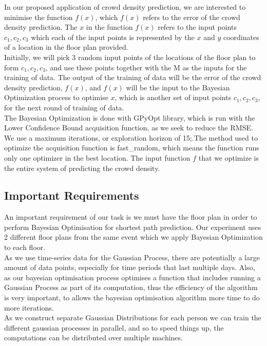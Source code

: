 \documentclass[letterpaper]{article}
\begin{document}
In our proposed application of crowd density prediction, we are interested to minimise the function $f(x)$, which $f(x)$ refers to the error of the crowd density prediction. The $x$ in the function $f(x)$ refers to the input points $c_1, c_2, c_3$ which each of the input points is represented by the $x$ and $y$ coordinates of a location in the floor plan provided.  \\

Initially, we will pick 3 random input points of the locations of the floor plan to form $c_1, c_2, c_3$, and use these points together with the M as the inputs for the training of data. The output of the training of data will be the error of the crowd density prediction, $f(x)$, and $f(x)$ will be the input to the Bayesian Optimization process to optimise $x$, which is another set of input points $c_1, c_2, c_3$, for the next round of training of data. \\

The Bayesian Optimization is done with GPyOpt library, which is run with the Lower Confidence Bound acquisition function, as we seek to reduce the RMSE. We use a maximum iterations, or exploration horizon of 15;.The method used to optimize the acquisition function is fast\_random, which means the function runs only one optimizer in the best location. The input function $f$ that we optimize is the entire system of predicting the crowd density.

\subsection{Important Requirements}

An important requirement of our task is we must have the floor plan in order to perform Bayesian Optimisation for shortest path prediction. Our experiment uses 2 different floor plans from the same event which we apply Bayesian Optimization to each floor.\\

As we use time-series data for the Gaussian Process, there are potentially a large amount of data points, especially for time periods that last multiple days. Also, as our bayesian optimisation process optimises a function that includes running a Gaussian Process as part of its computation, thus the efficiency of the algorithm is very important, to allows the bayesian optimisation algorithm more time to do more iterations.\\

As we construct separate Gaussian Distributions for each person we can train the different gaussian processes in parallel, and so to speed things up, the computations can be distributed over multiple machines.
\end{document}
